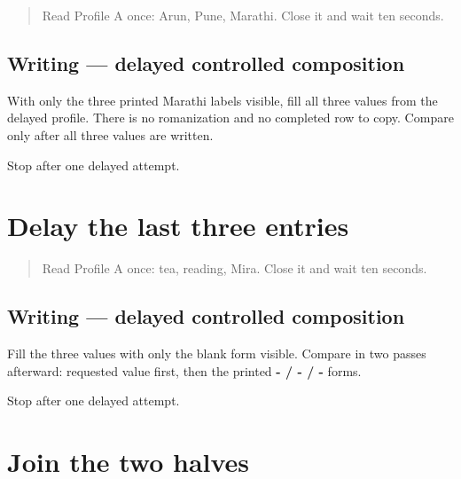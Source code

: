 \label{lesson:MR-A1F10-first-three-delayed}



\begin{quote}
Read Profile A once: Arun, Pune, Marathi. Close it and wait ten seconds.
\end{quote}

\subsection*{Writing — delayed controlled composition}
With only the three printed Marathi labels visible, fill all three values from the delayed profile. There is no romanization and no completed row to copy. Compare only after all three values are written.

\begin{tcolorbox}[breakable,colback=teal!4,colframe=teal!35!black,title={Before you move on}]
Stop after one delayed attempt.
\end{tcolorbox}
\section[\texorpdfstring{\mr{आवडते} \mr{पेय}: \mr{चहा} · \mr{आवडती} \mr{कृती}: \mr{वाचणे} …}{आवडते पेय: चहा · आवडती कृती: वाचणे …}]{Delay the last three entries}

\label{lesson:MR-A1F11-last-three-delayed}



\begin{quote}
Read Profile A once: tea, reading, Mira. Close it and wait ten seconds.
\end{quote}

\subsection*{Writing — delayed controlled composition}
Fill the three values with only the blank form visible. Compare in two passes afterward: requested value first, then the printed \textbf{- / - / -} forms.

\begin{tcolorbox}[breakable,colback=teal!4,colframe=teal!35!black,title={Before you move on}]
Stop after one delayed attempt.
\end{tcolorbox}
\section[six-field Marathi profile]{Join the two halves}

